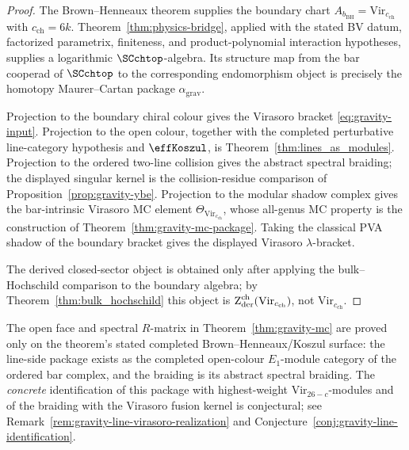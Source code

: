 \begin{proof}
The Brown--Henneaux theorem supplies the boundary chart
\(A_{b_{\mathrm{BH}}}=\mathrm{Vir}_{c_{\mathrm{ch}}}\)
with \(c_{\mathrm{ch}}=6k\).  Theorem~\ref{thm:physics-bridge},
applied with the stated BV datum, factorized parametrix, finiteness,
and product-polynomial interaction hypotheses, supplies a logarithmic
\(\SCchtop\)-algebra.  Its structure map from the bar cooperad of
\(\SCchtop\) to the corresponding endomorphism object is precisely the
homotopy Maurer--Cartan package \(\alpha_{\mathrm{grav}}\).

Projection to the boundary chiral colour gives the Virasoro bracket
\eqref{eq:gravity-input}.  Projection to the open colour, together
with the completed perturbative line-category hypothesis and
\(\effKoszul\), is Theorem~\ref{thm:lines_as_modules}.  Projection to
the ordered two-line collision gives the abstract spectral braiding;
the displayed singular kernel is the collision-residue comparison of
Proposition~\ref{prop:gravity-ybe}.  Projection to the modular shadow
complex gives the bar-intrinsic Virasoro MC element
\(\Theta_{\mathrm{Vir}_{c_{\mathrm{ch}}}}\), whose all-genus MC
property is the construction of Theorem~\ref{thm:gravity-mc-package}.
Taking the classical PVA shadow of the boundary bracket gives the
displayed Virasoro \(\lambda\)-bracket.

The derived closed-sector object is obtained only after applying the
bulk--Hochschild comparison to the boundary algebra; by
Theorem~\ref{thm:bulk_hochschild} this object is
\(\operatorname{Z}_{\mathrm{der}}^{\mathrm{ch}}(\mathrm{Vir}_{c_{\mathrm{ch}}})\), not
\(\mathrm{Vir}_{c_{\mathrm{ch}}}\).
\end{proof}

\begin{remark}
\label{rem:gravity-mc-scope}
The open face and spectral $R$-matrix in
Theorem~\ref{thm:gravity-mc} are proved only on the theorem's stated
completed Brown--Henneaux/Koszul surface: the line-side package exists
as the completed open-colour \(E_1\)-module category of the ordered
bar complex, and the braiding is its abstract spectral braiding. The
\emph{concrete} identification of this package with highest-weight
$\mathrm{Vir}_{26-c}$-modules and of the braiding with the Virasoro
fusion kernel is conjectural; see
Remark~\ref{rem:gravity-line-virasoro-realization} and
Conjecture~\ref{conj:gravity-line-identification}.
\end{remark}

